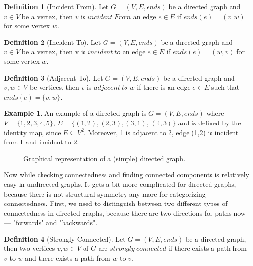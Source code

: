 \documentclass{report}
\theoremstyle{plain}
\theoremstyle{definition}
\newtheorem{definition}{Definition}
\newtheorem{example}{Example}
\theoremstyle{remark}
\numberwithin{definition}{chapter}
\numberwithin{example}{chapter}
\numberwithin{figure}{chapter}
\numberwithin{theorem}{chapter}
\numberwithin{lemma}{chapter}
\begin{document}
\begin{definition}[Incident From]
Let $G = (V, E, ends)$ be a directed graph and $v \in V$ be a vertex, then $v$ is $incident \ From$ an edge $e \in E$ if $ends(e)=(v, w)$ for some vertex $w$.
\end{definition}

\begin{definition}[Incident To]
Let $G = (V, E, ends)$ be a directed graph and $v \in V$ be a vertex, then v is $incident \ to$ an edge $e \in E$ if $ends(e)=(w, v)$ for some vertex $w$.
\end{definition}

\begin{definition}[Adjacent To]
Let $G = (V, E, ends)$ be a directed graph and $v,w\in V$ be vertices, then $v$ is $adjacent \ to$ $w$ if there is an edge $ e \in E$ such that $ends(e) = \{v, w\}$.
\end{definition}

\begin{example}
An example of a directed graph is $G=(V, E, ends)$ where $V=\{1,2,3,4,5\}$, $E=\{(1,2), (2,3), (3,1)$, $(4,3)\}$ and is defined by the identity map, since $E \subseteq V^2$. Moreover, 1 is adjacent to 2, edge (1,2) is incident from 1 and incident to 2.

\begin{figure}[h]
\center
{}
\caption{Graphical representation of a (simple) directed graph.}
\end{figure}
\end{example}

Now while checking connectedness and finding connected components is relatively easy in undirected graphs, It gets a bit more complicated for directed graphs, because there is not structural symmetry any more for categorizing connectedness. First, we need to distinguish between two different types of connectedness in directed graphs, because there are two directions for paths now --- "forwards" and "backwards".

\begin{definition}[Strongly Connected]
Let $G = (V, E, ends)$ be a directed graph, then two vertices $v, w \in V$ of $G$ are $strongly \ connected$ if there exists a path from $v$ to $w$ and there exists a path from $w$ to $v$.
\end{definition}
\end{document}
